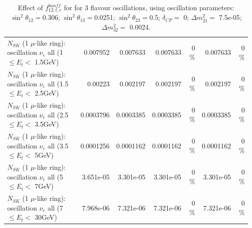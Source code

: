 \begin{table}
\begin{tabular}{| l | r | r | r  r | r  r |}
$N_{SK}$ (1 $\mu$-like ring): oscillation $\nu_{e}$ all (1 $\leq E_{t} <$ 1.5GeV) &        0.007952 &        0.007633 &        0.007633 &        0 \%  &        0.007633 &        0 \%  \\ 
$N_{SK}$ (1 $\mu$-like ring): oscillation $\nu_{e}$ all (1.5 $\leq E_{t} <$ 2.5GeV) &         0.00223 &        0.002197 &        0.002197 &        0 \%  &        0.002197 &        0 \%  \\ 
$N_{SK}$ (1 $\mu$-like ring): oscillation $\nu_{e}$ all (2.5 $\leq E_{t} <$ 3.5GeV) &       0.0003796 &       0.0003385 &       0.0003385 &        0 \%  &       0.0003385 &        0 \%  \\ 
$N_{SK}$ (1 $\mu$-like ring): oscillation $\nu_{e}$ all (3.5 $\leq E_{t} <$ 5GeV) &       0.0001256 &       0.0001162 &       0.0001162 &        0 \%  &       0.0001162 &        0 \%  \\ 
 $N_{SK}$ (1 $\mu$-like ring): oscillation $\nu_{e}$ all (5 $\leq E_{t} <$ 7GeV) &       3.651e-05 &       3.301e-05 &       3.301e-05 &        0 \%  &       3.301e-05 &        0 \%  \\ 
$N_{SK}$ (1 $\mu$-like ring): oscillation $\nu_{e}$ all (7 $\leq E_{t} <$ 30GeV) &       7.968e-06 &       7.321e-06 &       7.321e-06 &        0 \%  &       7.321e-06 &        0 \%  \\ 
\hline
\hline
\end{tabular}
\caption{ Effect of $f_{12; t, r}^{banff}$ for for 3 flavour oscillations, using oscillation parameters:  $\sin^2\theta_{12} = $0.306; $\sin^2\theta_{13} = $0.0251; $\sin^2\theta_{23} = $0.5; $\delta_{CP} = $        0; $\Delta m^2_{21} = $    7.5e-05; $\Delta m^2_{32} = $    0.0024. }
\label{tab:num_banff_12_1RmuT_3f_osc_t13:0.0251}
\end{table}
\clearpage
